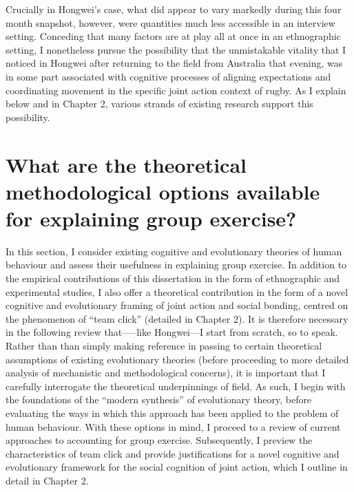Crucially in Hongwei's case, what did appear to vary markedly during this four month snapshot, however, were quantities much less accessible in an interview setting. Conceding that many factors are at play all at once in an ethnographic setting, I nonetheless pursue the possibility that the unmistakable vitality that I noticed in Hongwei after returning to the field from Australia that evening, was in some part associated with cognitive processes of aligning expectations and coordinating movement in the specific joint action context of rugby.  As I explain below and in Chapter 2, various strands of existing research support this possibility.


\section{What are the theoretical methodological options available for explaining group exercise?}
In this section, I consider existing cognitive and evolutionary theories of human behaviour and assess their usefulness in explaining group exercise. In addition to the empirical contributions of this dissertation in the form of ethnographic and experimental studies, I also offer a theoretical contribution in the form of a novel cognitive and evolutionary framing of joint action and social bonding, centred on the phenomenon of ``team click'' (detailed in Chapter 2). It is therefore necessary in the following review that—--like Hongwei---I start from scratch, so to speak.  Rather than than simply making reference in passing to certain theoretical assumptions of existing evolutionary theories (before proceeding to more detailed analysis of mechanistic and methodological concerns), it is important that I carefully interrogate the theoretical underpinnings of field.  As such, I begin with the foundations of the ``modern synthesis'' of evolutionary theory, before evaluating the ways in which this approach has been applied to the problem of human behaviour.  With these options in mind, I proceed to a review of current approaches to accounting for group exercise.  Subsequently, I preview the characteristics of team click and provide justifications for a novel cognitive and evolutionary framework for the social cognition of joint action, which I outline in detail in Chapter 2.

